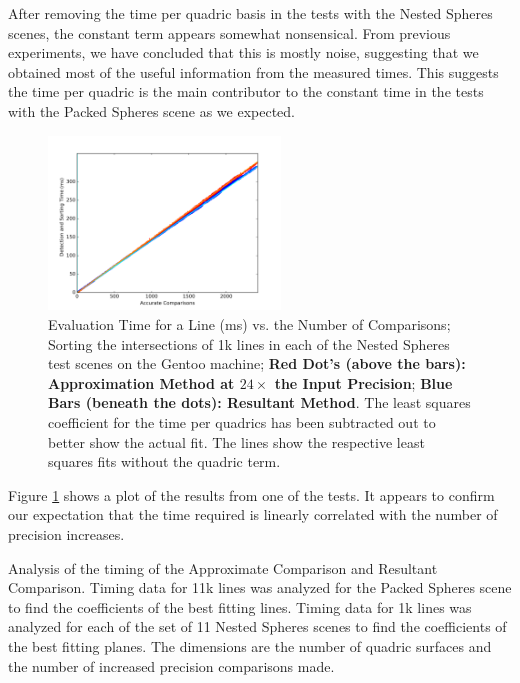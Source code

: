 \documentclass{cccg16}
\begin{document}
After removing the time per quadric basis in the tests with the Nested
Spheres scenes, the constant term appears somewhat nonsensical.  From
previous experiments, we have concluded that this is mostly noise,
suggesting that we obtained most of the useful information from the
measured times.  This suggests the time per quadric is the main
contributor to the constant time in the tests with the Packed Spheres
scene as we expected.

\begin{figure}
  \includegraphics[width=0.55\textwidth]{imgs/hardEllipsoidsSingle_gentoo_adjusted.png}
  \caption{Evaluation Time for a Line (ms) vs. the Number of
    Comparisons; Sorting the intersections of 1k lines in each of the
    Nested Spheres test scenes on the Gentoo machine; {\bf Red Dot's
      (above the bars): Approximation Method at $24\times$ the Input
      Precision}; {\bf Blue Bars (beneath the dots): Resultant
      Method}.  The least squares coefficient for the time per
    quadrics has been subtracted out to better show the actual
    fit. The lines show the respective least squares fits without the
    quadric term.}
  \label{fig:linefit}
\end{figure}

Figure \ref{fig:linefit} shows a plot of the results from one of the
tests.  It appears to confirm our expectation that the time required
is linearly correlated with the number of precision increases.

\begin{table}
  \caption{Analysis of the timing of the Approximate Comparison and
    Resultant Comparison.  Timing data for 11k lines was analyzed for
    the Packed Spheres scene to find the coefficients of the best
    fitting lines.  Timing data for 1k lines was analyzed for each of
    the set of 11 Nested Spheres scenes to find the coefficients of
    the best fitting planes.  The dimensions are the number of quadric
    surfaces and the number of increased precision comparisons made.}
  \label{tab:times}
  \centering
  
\end{table}
\end{document}
